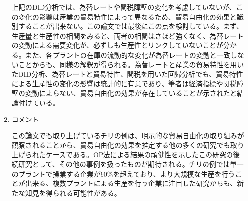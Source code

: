\documentclass{jsarticle}
\begin{document}
\begin{enumerate}
上記のDID分析では、為替レートや関税障壁の変化を考慮していないが、この変化の影響は産業の貿易特性によって異なるため、貿易自由化の効果と識別することが出来ない。この論文では最後にこの点を検討している。まず、生産量と生産性の相関をみると、両者の相関はさほど強くなく、為替レートの変動による需要変化が、必ずしも生産性とリンクしていないことが分かる。また、各プラントの在庫の流動的な変化が為替レートの変動と一致しないことからも、同様の解釈が得られる。為替レートと産業の貿易特性を用いたDID分析、為替レートと貿易特性、関税を用いた回帰分析でも、貿易特性による生産性の変化の影響は統計的に有意であり、筆者は経済指標や関税障壁の変動によらない、貿易自由化の効果が存在していることが示されたと結論付けている。

\item コメント

この論文でも取り上げているチリの例は、明示的な貿易自由化の取り組みが観察されることから、貿易自由化の効果を推定する他の多くの研究でも取り上げられたケースである。OP法による結果の頑健性を示したこの研究の後続研究として、その他の事例を扱ったものが期待される。チリの例では単一のプラントで操業する企業が90\%を超えており、より大規模な生産を行うことが出来る、複数プラントによる生産を行う企業に注目した研究からも、新たな知見を得られる可能性がある。

\end{enumerate}
\end{document}
